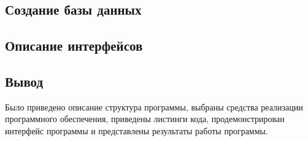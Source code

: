 \subsection{Создание базы данных}

\subsection{Описание интерфейсов}

\subsection*{Вывод}
Было приведено описание структура программы, выбраны средства реализации программного обеспечения, приведены листинги кода, продемонстрирован интерфейс программы и представлены результаты работы программы. 
